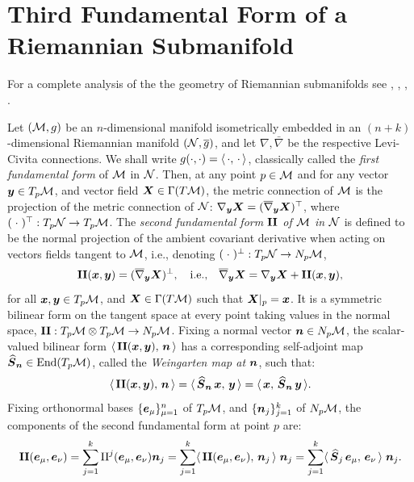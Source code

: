 \documentclass[letterpaper, reqno, 11pt]{amsart}
\theoremstyle{definition}
\theoremstyle{remark}
\numberwithin{equation}{section}
\begin{document}
\section{Third Fundamental Form of a Riemannian Submanifold}\label{sec:IIIform}

For a complete analysis of the the geometry of Riemannian submanifolds see \cite{chavel2006}, \cite{kobayashi1969}, \cite{oneil1983}, \cite{spivak1999}. 

Let $({\mathcal M},g)$ be an $n$-dimensional manifold isometrically embedded in an $(n+k)$-dimensional Riemannian manifold $(\mathcal{N},\overline{g})$, and let $\nabla,\bar{\nabla}$ be the respective Levi-Civita connections. We shall write $g(\cdot,\cdot) = \langle\, {\cdot},\,{\cdot}\,\rangle$, classically called the \emph{first fundamental form} of ${\mathcal M}$ in $\mathcal{N}$. Then, at any point $p\in{\mathcal M}$ and for any vector $\boldsymbol{y}\in T_p{\mathcal M}$, and vector field $\boldsymbol{X}\in\Gamma(T{\mathcal M})$, the metric connection of ${\mathcal M}$ is the projection of the metric connection of $\mathcal{N}$: $\nabla_{\boldsymbol{y}}\boldsymbol{X} = (\overline{\nabla}_{\boldsymbol{y}}\boldsymbol{X})^\top$, where $(\;\cdot\;)^\top:T_p\mathcal{N}\rightarrow T_p{\mathcal M}$. The \emph{second fundamental form $\boldsymbol{\mathrm{II}}$ of ${\mathcal M}$ in $\mathcal{N}$} is defined to be the normal projection of the ambient covariant derivative when acting on vectors fields tangent to ${\mathcal M}$, i.e., denoting $(\;\cdot\;)^\perp:T_p\mathcal{N}\rightarrow N_p{\mathcal M}$,
\begin{equation}
	\boldsymbol{\mathrm{II}}(\boldsymbol{x},\boldsymbol{y}) = (\overline{\nabla}_{\boldsymbol{y}}\boldsymbol{X})^\perp, \quad \text{i.e.,} \quad \overline{\nabla}_{\boldsymbol{y}}\boldsymbol{X} = \nabla_{\boldsymbol{y}}\boldsymbol{X} + \boldsymbol{\mathrm{II}}(\boldsymbol{x},\boldsymbol{y}),
\end{equation}
for all $\boldsymbol{x},\boldsymbol{y}\in T_p{\mathcal M}$, and $\boldsymbol{X}\in\Gamma(T{\mathcal M})$ such that $\boldsymbol{X}\vert_p=\boldsymbol{x}$. It is a symmetric bilinear form on the tangent space at every point taking values in the normal space, $\boldsymbol{\mathrm{II}}:T_p{\mathcal M}\otimes T_p{\mathcal M}\rightarrow N_p{\mathcal M}$. Fixing a normal vector $\boldsymbol{n}\in N_p{\mathcal M}$, the scalar-valued bilinear form $\langle\, {\boldsymbol{\mathrm{II}}(\boldsymbol{x},\boldsymbol{y})},\,{\boldsymbol{n}}\,\rangle$ has a corresponding self-adjoint map $\boldsymbol{\widehat{S}}_{\boldsymbol{n}}\in\text{End}(T_p{\mathcal M})$, called the \emph{Weingarten map at $\boldsymbol{n}$}, such that:
\begin{equation}
	\langle\, {\boldsymbol{\mathrm{II}}(\boldsymbol{x},\boldsymbol{y})},\,{\boldsymbol{n}}\,\rangle = \langle\, {\boldsymbol{\widehat{S}}_{\boldsymbol{n}}\,\boldsymbol{x}},\,{\boldsymbol{y}}\,\rangle = \langle\, {\boldsymbol{x}},\,{\boldsymbol{\widehat{S}}_{\boldsymbol{n}}\,\boldsymbol{y}}\,\rangle.
\end{equation}
Fixing orthonormal bases $\{\boldsymbol{e}_\mu\}_{\mu=1}^n$ of $T_p{\mathcal M}$, and $\{\boldsymbol{n}_j\}_{j=1}^k$ of $N_p{\mathcal M}$, the components of the second fundamental form at point $p$ are:
\begin{equation}
	\boldsymbol{\mathrm{II}}(\boldsymbol{e}_\mu,\boldsymbol{e}_\nu) = \sum_{j=1}^k \mathrm{II}^j(\boldsymbol{e}_\mu,\boldsymbol{e}_\nu)\boldsymbol{n}_j = \sum_{j=1}^k \langle\, {\boldsymbol{\mathrm{II}}(\boldsymbol{e}_\mu,\boldsymbol{e}_\nu)},\,{\boldsymbol{n}_j}\,\rangle\;\boldsymbol{n}_j = \sum_{j=1}^k \langle\, {\boldsymbol{\widehat{S}}_j\,\boldsymbol{e}_\mu},\,{\boldsymbol{e}_\nu}\,\rangle\;\boldsymbol{n}_j.
\end{equation}
\end{document}
